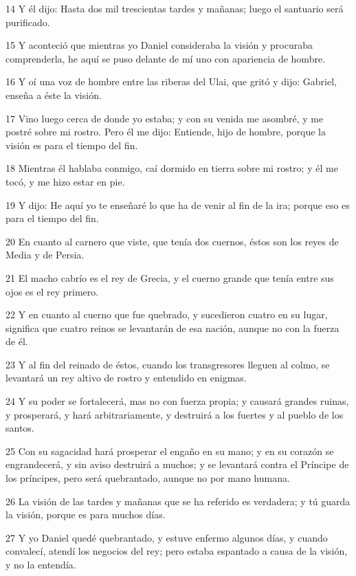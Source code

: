 \par 14 Y él dijo: Hasta dos mil trescientas tardes y mañanas; luego el santuario será purificado.
\par 15 Y aconteció que mientras yo Daniel consideraba la visión y procuraba comprenderla, he aquí se puso delante de mí uno con apariencia de hombre.
\par 16 Y oí una voz de hombre entre las riberas del Ulai, que gritó y dijo: Gabriel, enseña a éste la visión.
\par 17 Vino luego cerca de donde yo estaba; y con su venida me asombré, y me postré sobre mi rostro. Pero él me dijo: Entiende, hijo de hombre, porque la visión es para el tiempo del fin.
\par 18 Mientras él hablaba conmigo, caí dormido en tierra sobre mi rostro; y él me tocó, y me hizo estar en pie.
\par 19 Y dijo: He aquí yo te enseñaré lo que ha de venir al fin de la ira; porque eso es para el tiempo del fin.
\par 20 En cuanto al carnero que viste, que tenía dos cuernos, éstos son los reyes de Media y de Persia.
\par 21 El macho cabrío es el rey de Grecia, y el cuerno grande que tenía entre sus ojos es el rey primero.
\par 22 Y en cuanto al cuerno que fue quebrado, y sucedieron cuatro en su lugar, significa que cuatro reinos se levantarán de esa nación, aunque no con la fuerza de él.
\par 23 Y al fin del reinado de éstos, cuando los transgresores lleguen al colmo, se levantará un rey altivo de rostro y entendido en enigmas.
\par 24 Y su poder se fortalecerá, mas no con fuerza propia; y causará grandes ruinas, y prosperará, y hará arbitrariamente, y destruirá a los fuertes y al pueblo de los santos.
\par 25 Con su sagacidad hará prosperar el engaño en su mano; y en su corazón se engrandecerá, y sin aviso destruirá a muchos; y se levantará contra el Príncipe de los príncipes, pero será quebrantado, aunque no por mano humana.
\par 26 La visión de las tardes y mañanas que se ha referido es verdadera; y tú guarda la visión, porque es para muchos días.
\par 27 Y yo Daniel quedé quebrantado, y estuve enfermo algunos días, y cuando convalecí, atendí los negocios del rey; pero estaba espantado a causa de la visión, y no la entendía.

